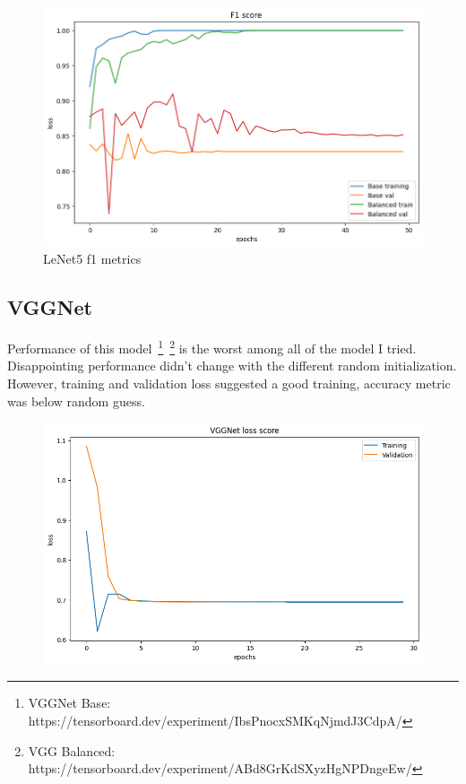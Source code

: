 \begin{figure}[H]
    \centering
    \includegraphics[width=.8\textwidth]{img/lenetf1.png}
    \caption{LeNet5 f1 metrics}
    \label{fig:lenetloss}
\end{figure}



\subsection{VGGNet}
Performance of this model~\footnote{VGGNet Base: https://tensorboard.dev/experiment/IbsPnocxSMKqNjmdJ3CdpA/}~\footnote{VGG Balanced: https://tensorboard.dev/experiment/ABd8GrKdSXyzHgNPDngeEw/} is the worst among all of the model I tried.
Disappointing performance didn't change with the different random initialization.
However, training and validation loss suggested a good training, accuracy metric was below random guess.

\begin{figure}[H]
    \centering
    \includegraphics[width=.8\textwidth]{img/vggnetloss.png}
    \caption{}
    \label{fig:vggloss}
\end{figure}

